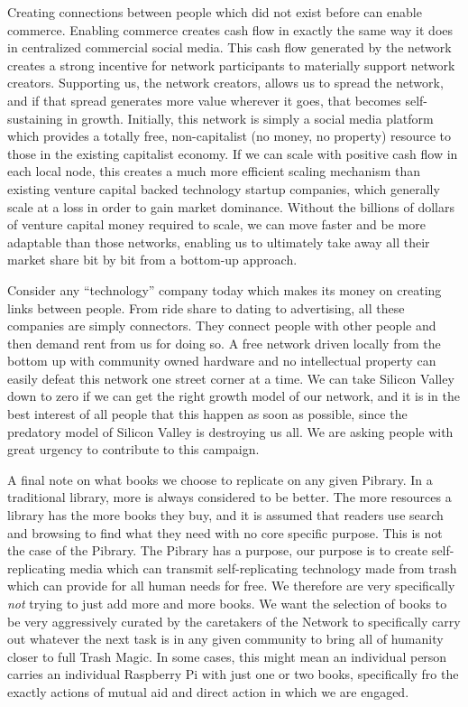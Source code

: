 Creating connections between people which did not exist before can
enable commerce. Enabling commerce creates cash flow in exactly the same
way it does in centralized commercial social media. This cash flow
generated by the network creates a strong incentive for network
participants to materially support network creators. Supporting us, the
network creators, allows us to spread the network, and if that spread
generates more value wherever it goes, that becomes self-sustaining in
growth. Initially, this network is simply a social media platform which
provides a totally free, non-capitalist (no money, no property) resource
to those in the existing capitalist economy. If we can scale with
positive cash flow in each local node, this creates a much more
efficient scaling mechanism than existing venture capital backed
technology startup companies, which generally scale at a loss in order
to gain market dominance. Without the billions of dollars of venture
capital money required to scale, we can move faster and be more
adaptable than those networks, enabling us to ultimately take away all
their market share bit by bit from a bottom-up approach.

Consider any ``technology'' company today which makes its money on
creating links between people. From ride share to dating to advertising,
all these companies are simply connectors. They connect people with
other people and then demand rent from us for doing so. A free network
driven locally from the bottom up with community owned hardware and no
intellectual property can easily defeat this network one street corner
at a time. We can take Silicon Valley down to zero if we can get the
right growth model of our network, and it is in the best interest of all
people that this happen as soon as possible, since the predatory model
of Silicon Valley is destroying us all. We are asking people with great
urgency to contribute to this campaign.

A final note on what books we choose to replicate on any given Pibrary.
In a traditional library, more is always considered to be better. The
more resources a library has the more books they buy, and it is assumed
that readers use search and browsing to find what they need with no core
specific purpose. This is not the case of the Pibrary. The Pibrary has a
purpose, our purpose is to create self-replicating media which can
transmit self-replicating technology made from trash which can provide
for all human needs for free. We therefore are very specifically
\emph{not} trying to just add more and more books. We want the selection
of books to be very aggressively curated by the caretakers of the
Network to specifically carry out whatever the next task is in any given
community to bring all of humanity closer to full Trash Magic. In some
cases, this might mean an individual person carries an individual
Raspberry Pi with just one or two books, specifically fro the exactly
actions of mutual aid and direct action in which we are engaged.
